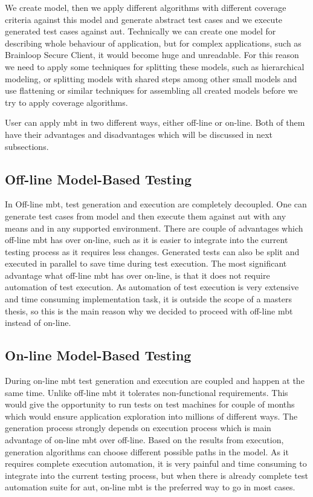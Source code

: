 We create model, then we apply different algorithms with different coverage criteria against this model and generate abstract test cases and we execute generated test cases against \acrlong{aut}. Technically we can create one model for describing whole behaviour of application, but for complex applications, such as Brainloop Secure Client, it would become huge and unreadable. For this reason we need to apply some techniques for splitting these models, such as hierarchical modeling, or splitting models with shared steps among other small models and use flattening or similar techniques for assembling all created models before we try to apply coverage algorithms.

\par
User can apply \acrshort{mbt} in two different ways, either off-line or on-line. Both of them have their advantages and disadvantages which will be discussed in next subsections.

\subsection{Off-line Model-Based Testing}
In Off-line \acrshort{mbt}, test generation and execution are completely decoupled. One can generate test cases from model and then execute them against \acrlong{aut} with any means and in any supported environment. There are couple of advantages which off-line \acrshort{mbt} has over on-line, such as it is easier to integrate into the current testing process as it requires less changes. Generated tests can also be split and executed in parallel to save time during test execution. The most significant advantage what off-line \acrshort{mbt} has over on-line, is that it does not require automation of test execution. As automation of test execution is very extensive and time consuming implementation task, it is outside the scope of a masters thesis, so this is the main reason why we decided to proceed with off-line \acrshort{mbt} instead of on-line.

\subsection{On-line Model-Based Testing}
During on-line \acrshort{mbt} test generation and execution are coupled and happen at the same time. Unlike off-line \acrshort{mbt} it tolerates non-functional requirements. This would give the opportunity to run tests on test machines for couple of months which would ensure application exploration into millions of different ways. The generation process strongly depends on execution process which is main advantage of on-line \acrshort{mbt} over off-line.    Based on the results from execution, generation algorithms can choose different possible paths in the model. As it requires complete execution automation, it is very painful and time consuming to integrate into the current testing process, but when there is already complete test automation suite for \acrlong{aut}, on-line \acrshort{mbt} is the preferred way to go in most cases.


